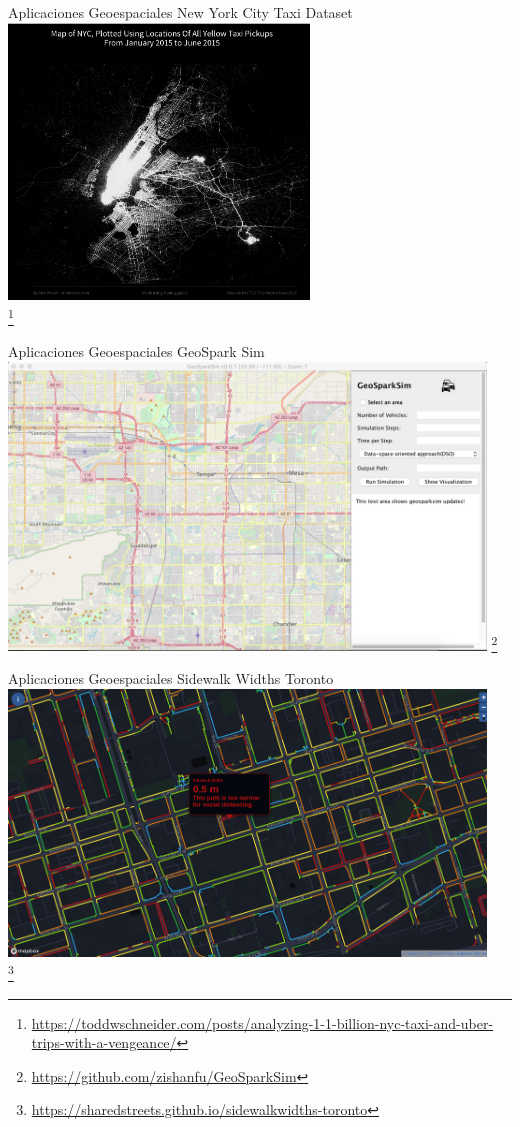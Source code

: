 \documentclass{beamer}
\newcommand\blfootnote[1]{%
  \begingroup
  \renewcommand\thefootnote{}\footnote{#1}%
  \addtocounter{footnote}{-1}%
  \endgroup
}
\begin{document}
\begin{frame}{Aplicaciones Geoespaciales}
    New York City Taxi Dataset  
    \centering
    \includegraphics[width=0.6\textwidth]{figures/nytaxi}\\
    \blfootnote{\url{https://toddwschneider.com/posts/analyzing-1-1-billion-nyc-taxi-and-uber-trips-with-a-vengeance/}}
\end{frame}

\begin{frame}{Aplicaciones Geoespaciales}
    GeoSpark Sim
    \centering
    \includegraphics[width=0.95\textwidth]{figures/geosparksim}
    \blfootnote{\url{https://github.com/zishanfu/GeoSparkSim}}
\end{frame}

\begin{frame}{Aplicaciones Geoespaciales}
    Sidewalk Widths Toronto
    \centering
    \includegraphics[width=0.95\textwidth]{figures/distancing}\\
    \blfootnote{\url{https://sharedstreets.github.io/sidewalkwidths-toronto}}
\end{frame}
\end{document}
